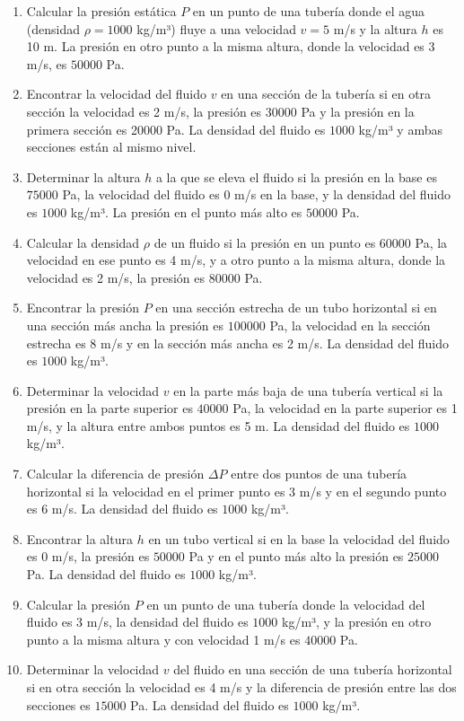 \documentclass[../main]{subfiles}
\begin{document}
\begin{enumerate}
    \item Calcular la presión estática $P$ en un punto de una tubería donde el agua (densidad $\rho = 1000$ kg/m³) fluye a una velocidad $v = 5$ m/s y la altura $h$ es 10 m. La presión en otro punto a la misma altura, donde la velocidad es 3 m/s, es $50000$ Pa.
    \item Encontrar la velocidad del fluido $v$ en una sección de la tubería si en otra sección la velocidad es 2 m/s, la presión es 30000 Pa y la presión en la primera sección es 20000 Pa. La densidad del fluido es $1000$ kg/m³ y ambas secciones están al mismo nivel.
    \item Determinar la altura $h$ a la que se eleva el fluido si la presión en la base es $75000$ Pa, la velocidad del fluido es 0 m/s en la base, y la densidad del fluido es $1000$ kg/m³. La presión en el punto más alto es $50000$ Pa.
    \item Calcular la densidad $\rho$ de un fluido si la presión en un punto es $60000$ Pa, la velocidad en ese punto es 4 m/s, y a otro punto a la misma altura, donde la velocidad es 2 m/s, la presión es $80000$ Pa.
    \item Encontrar la presión $P$ en una sección estrecha de un tubo horizontal si en una sección más ancha la presión es $100000$ Pa, la velocidad en la sección estrecha es 8 m/s y en la sección más ancha es 2 m/s. La densidad del fluido es $1000$ kg/m³.
    \item Determinar la velocidad $v$ en la parte más baja de una tubería vertical si la presión en la parte superior es $40000$ Pa, la velocidad en la parte superior es 1 m/s, y la altura entre ambos puntos es 5 m. La densidad del fluido es $1000$ kg/m³.
    \item Calcular la diferencia de presión $\Delta P$ entre dos puntos de una tubería horizontal si la velocidad en el primer punto es 3 m/s y en el segundo punto es 6 m/s. La densidad del fluido es $1000$ kg/m³.
    \item Encontrar la altura $h$ en un tubo vertical si en la base la velocidad del fluido es 0 m/s, la presión es $50000$ Pa y en el punto más alto la presión es $25000$ Pa. La densidad del fluido es $1000$ kg/m³.
    \item Calcular la presión $P$ en un punto de una tubería donde la velocidad del fluido es 3 m/s, la densidad del fluido es $1000$ kg/m³, y la presión en otro punto a la misma altura y con velocidad 1 m/s es $40000$ Pa.
    \item Determinar la velocidad $v$ del fluido en una sección de una tubería horizontal si en otra sección la velocidad es 4 m/s y la diferencia de presión entre las dos secciones es $15000$ Pa. La densidad del fluido es $1000$ kg/m³.
\end{enumerate}
\end{document}
